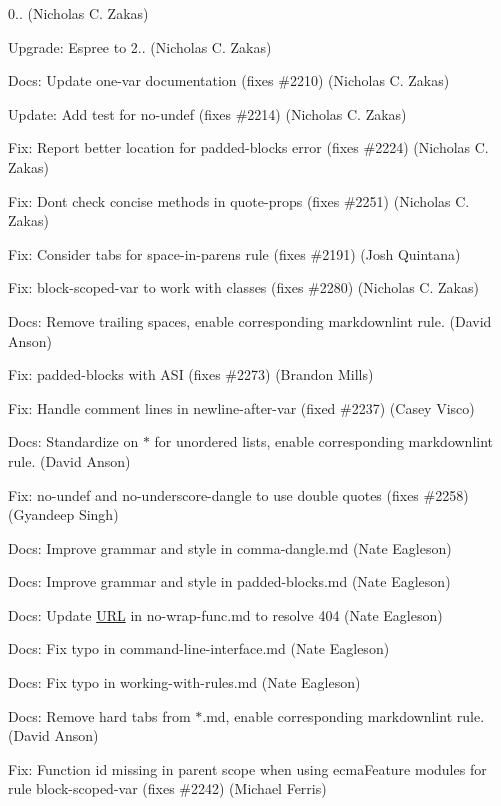 \begin{DoxyItemize}
\item 0.. (Nicholas C. Zakas)
\item Upgrade\+: Espree to 2.. (Nicholas C. Zakas)
\item Docs\+: Update one-\/var documentation (fixes \#2210) (Nicholas C. Zakas)
\item Update\+: Add test for no-\/undef (fixes \#2214) (Nicholas C. Zakas)
\item Fix\+: Report better location for padded-\/blocks error (fixes \#2224) (Nicholas C. Zakas)
\item Fix\+: Don\textquotesingle{}t check concise methods in quote-\/props (fixes \#2251) (Nicholas C. Zakas)
\item Fix\+: Consider tabs for space-\/in-\/parens rule (fixes \#2191) (Josh Quintana)
\item Fix\+: block-\/scoped-\/var to work with classes (fixes \#2280) (Nicholas C. Zakas)
\item Docs\+: Remove trailing spaces, enable corresponding markdownlint rule. (David Anson)
\item Fix\+: padded-\/blocks with A\+SI (fixes \#2273) (Brandon Mills)
\item Fix\+: Handle comment lines in newline-\/after-\/var (fixed \#2237) (Casey Visco)
\item Docs\+: Standardize on \textquotesingle{}$\ast$\textquotesingle{} for unordered lists, enable corresponding markdownlint rule. (David Anson)
\item Fix\+: no-\/undef and no-\/underscore-\/dangle to use double quotes (fixes \#2258) (Gyandeep Singh)
\item Docs\+: Improve grammar and style in comma-\/dangle.\+md (Nate Eagleson)
\item Docs\+: Improve grammar and style in padded-\/blocks.\+md (Nate Eagleson)
\item Docs\+: Update \mbox{\hyperlink{namespace_u_r_l}{U\+RL}} in no-\/wrap-\/func.\+md to resolve 404 (Nate Eagleson)
\item Docs\+: Fix typo in command-\/line-\/interface.\+md (Nate Eagleson)
\item Docs\+: Fix typo in working-\/with-\/rules.\+md (Nate Eagleson)
\item Docs\+: Remove hard tabs from $\ast$.md, enable corresponding markdownlint rule. (David Anson)
\item Fix\+: Function id missing in parent scope when using ecma\+Feature {\ttfamily modules} for rule block-\/scoped-\/var (fixes \#2242) (Michael Ferris)

\end{DoxyItemize}
